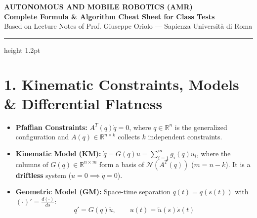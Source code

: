 \documentclass[10pt, a4paper]{article}
\begin{document}
\begin{center}
    {\Large \textbf{\textcolor{primary}{AUTONOMOUS AND MOBILE ROBOTICS (AMR)}}} \\[2pt]
    {\normalsize \textbf{Complete Formula \& Algorithm Cheat Sheet for Class Tests}} \\[2pt]
    {\footnotesize Based on Lecture Notes of Prof. Giuseppe Oriolo — Sapienza Universit\`a di Roma}
\end{center}
\vspace{2pt}
\hrule height 1.2pt
\vspace{6pt}

\section*{1. Kinematic Constraints, Models \& Differential Flatness}

\begin{itemize}
    \item \textbf{Pfaffian Constraints:} $A^T(q)\dot{q} = 0$, where $q \in \mathbb{R}^n$ is the generalized configuration and $A(q) \in \mathbb{R}^{n \times k}$ collects $k$ independent constraints.
    \item \textbf{Kinematic Model (KM):} $\dot{q} = G(q)u = \sum_{i=1}^{m} g_i(q)u_i$, where the columns of $G(q) \in \mathbb{R}^{n \times m}$ form a basis of $\mathcal{N}(A^T(q))$ ($m = n - k$). It is a \textbf{driftless} system ($u = 0 \implies \dot{q} = 0$).
    \item \textbf{Geometric Model (GM):} Space-time separation $q(t) = q(s(t))$ with $(\cdot)' = \frac{d(\cdot)}{ds}$:
    \[
        q' = G(q)\tilde{u}, \qquad u(t) = \tilde{u}(s)\dot{s}(t)
    \]
\end{itemize}
\end{document}
